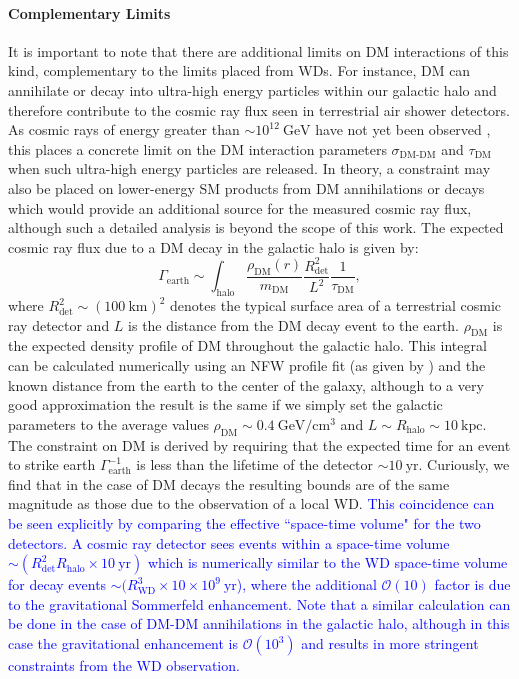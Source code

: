 \documentclass[twocolumn, preprintnumbers,amsmath,amssymb,prd, superscriptaddress]{revtex4}
\newcommand{\OO}{\mathcal{O}}
\newcommand{\GeV}{\text{GeV}}
\newcommand{\cm}{\text{cm}}
\begin{document}
\paragraph{Complementary Limits}
It is important to note that there are additional limits on DM interactions of this kind, complementary to the limits placed from WDs.
For instance, DM can annihilate or decay into ultra-high energy particles within our galactic halo and therefore contribute to the cosmic ray flux seen in terrestrial air shower detectors.
As cosmic rays of energy greater than $\sim 10^{12} ~\GeV$ have not yet been observed \cite{ThePierreAuger:2015rha, AbuZayyad:2012ru}, this places a concrete limit on the DM interaction parameters $\sigma_\text{DM-DM}$ and $\tau_\text{DM}$ when such ultra-high energy particles are released.
In theory, a constraint may also be placed on lower-energy SM products from DM annihilations or decays which would provide an additional source for the measured cosmic ray flux, although such a detailed analysis is beyond the scope of this work.
The expected cosmic ray flux due to a DM decay in the galactic halo is given by:
\begin{equation}
\Gamma_\text{earth} \sim \int_{\text{halo}} \frac{\rho_\text{DM}(r)}{m_\text{DM}} \frac{R_\text{det}^2}{L^2} \frac{1}{\tau_\text{DM}},
\end{equation}
where $R_\text{det}^2 \sim (100 ~\text{km})^2$ denotes the typical surface area of a terrestrial cosmic ray detector and $L$ is the distance from the DM decay event to the earth.
$\rho_\text{DM}$ is the expected density profile of DM throughout the galactic halo.
This integral can be calculated numerically using an NFW profile fit (as given by \cite{Nesti:2013uwa}) and the known distance from the earth to the center of the galaxy, although to a very good approximation the result is the same if we simply set the galactic parameters to the average values $\rho_\text{DM} \sim 0.4 ~\GeV/\cm^3$ and $L \sim R_\text{halo} \sim 10 ~\text{kpc}$.
The constraint on DM is derived by requiring that the expected time for an event to strike earth $\Gamma_\text{earth}^{-1}$ is less than the lifetime of the detector $\sim 10 ~\text{yr}$.
Curiously, we find that in the case of DM decays the resulting bounds are of the same magnitude as those due to the observation of a local WD.
\textcolor{blue}{This coincidence can be seen explicitly by comparing the effective ``space-time volume" for the two detectors.
A cosmic ray detector sees events within a space-time volume $\sim (R_\text{det}^2 R_\text{halo} \times 10 ~\text{yr})$ which is numerically similar to the WD space-time volume for decay events $\sim (R_\text{WD}^3 \times 10 \times 10^9 ~\text{yr}$), where the additional $\OO(10)$ factor is due to the gravitational Sommerfeld enhancement.
Note that a similar calculation can be done in the case of DM-DM annihilations in the galactic halo, although in this case the gravitational enhancement is $\OO(10^3)$ and results in more stringent constraints from the WD observation.}
\end{document}
